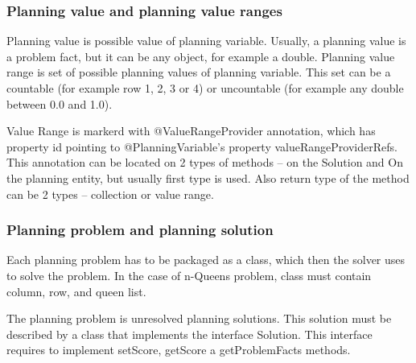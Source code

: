 \subsubsection{Planning value and planning value ranges}
Planning value is possible value of planning variable. Usually, a planning value is a problem fact, but it can be any object, for example a double. Planning value range is set of possible planning values of planning variable. This set can be a countable (for example row 1, 2, 3 or 4) or uncountable (for example any double between 0.0 and 1.0).

Value Range is markerd with @ValueRangeProvider annotation, which has property id pointing to @PlanningVariable's property valueRangeProviderRefs. This annotation can be located on 2 types of methods -- on the Solution and On the planning entity, but usually first type is used. Also return type of the method can be 2 types -- collection or value range.

\subsubsection{Planning problem and planning solution}
Each planning problem has to be packaged as a class, which then the solver uses to solve the problem. In the case of n-Queens problem, class must contain column, row, and queen list.

The planning problem is unresolved planning solutions. This solution must be described by a class that implements the interface Solution. This interface requires to implement setScore, getScore a getProblemFacts methods.

